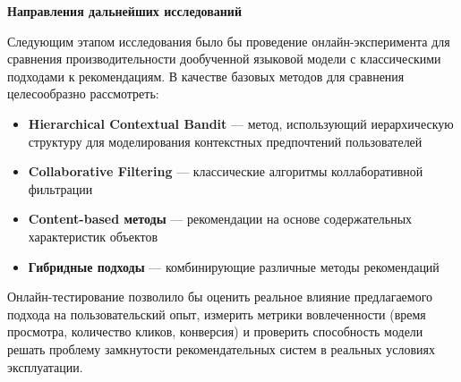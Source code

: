 \textbf{Направления дальнейших исследований}

Следующим этапом исследования было бы проведение онлайн-эксперимента для сравнения производительности дообученной языковой модели с классическими подходами к рекомендациям. В качестве базовых методов для сравнения целесообразно рассмотреть:

\begin{itemize}
    \item \textbf{Hierarchical Contextual Bandit} — метод, использующий иерархическую структуру для моделирования контекстных предпочтений пользователей
    \item \textbf{Collaborative Filtering} — классические алгоритмы коллаборативной фильтрации
    \item \textbf{Content-based методы} — рекомендации на основе содержательных характеристик объектов
    \item \textbf{Гибридные подходы} — комбинирующие различные методы рекомендаций
\end{itemize}

Онлайн-тестирование позволило бы оценить реальное влияние предлагаемого подхода на пользовательский опыт, измерить метрики вовлеченности (время просмотра, количество кликов, конверсия) и проверить способность модели решать проблему замкнутости рекомендательных систем в реальных условиях эксплуатации.
